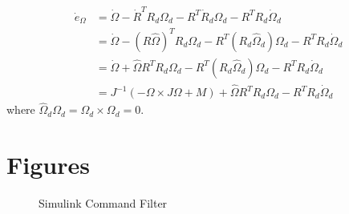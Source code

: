 \begin{equation}\label{key}
\begin{aligned}
\dot{e}_\Omega&=\dot{\Omega}-\dot{R}^TR_d\Omega_d-R^T\dot{R}_d\Omega_d-R^TR_d\dot{\Omega}_d\\
&=\dot{\Omega}-(R\hat{\Omega})^TR_d\Omega_d-R^T({R}_d\hat{\Omega}_d)\Omega_d-R^TR_d\dot{\Omega}_d\\
&=\dot{\Omega}+\hat{\Omega}R^TR_d\Omega_d-R^T({R}_d\hat{\Omega}_d)\Omega_d-R^TR_d\dot{\Omega}_d\\
&=J^{-1}(-\Omega\times J\Omega + M)+\hat{\Omega}R^TR_d\Omega_d-R^TR_d\dot{\Omega}_d
\end{aligned}
\end{equation}
where $\hat{\Omega}_d\Omega_d=\Omega_d \times \Omega_d=0  $.

\section{Figures}
\begin{figure}[h!]
	\centering
	\caption{Simulink Command Filter\label{fig:app.CF}}
\end{figure}		

%
%

%
%        

%
%
